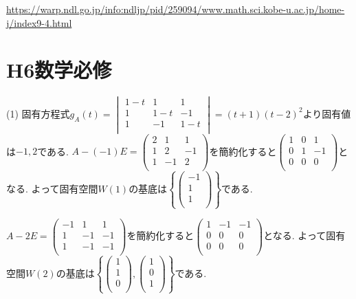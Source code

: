 \documentclass[
		book,
		head_space=20mm,
		foot_space=20mm,
		gutter=10mm,
		line_length=190mm
]{jlreq}
\begin{document}
\url{https://warp.ndl.go.jp/info:ndljp/pid/259094/www.math.sci.kobe-u.ac.jp/home-j/index9-4.html}

\section{H6数学必修}
(1) 固有方程式$g_A(t) = 
\begin{vmatrix}
1-t & 1 & 1 \\
1 & 1-t & -1 \\
1 & -1 & 1-t \\	
\end{vmatrix}=(t+1)(t-2)^2$より固有値は$-1,2$である.
$A-(-1)E= \begin{pmatrix}
2 & 1 & 1 \\
1 & 2 & -1 \\
1 & -1 & 2 \\
\end{pmatrix}$を簡約化すると$\begin{pmatrix}
1 & 0 & 1 \\
0 & 1 & -1 \\
0 & 0 & 0 \\
\end{pmatrix}$となる. よって固有空間$W(1)$の基底は$\left\{\begin{pmatrix}
-1 \\
1 \\
1 \\
\end{pmatrix}\right\}$である. 

$A-2E= \begin{pmatrix}
-1 & 1 & 1 \\
1 & -1 & -1 \\
1 & -1 & -1 \\
\end{pmatrix}$を簡約化すると$\begin{pmatrix}
1 & -1 & -1 \\
0 & 0 & 0 \\
0 & 0 & 0 \\
\end{pmatrix}$となる. よって固有空間$W(2)$の基底は$\left\{\begin{pmatrix}
1 \\
1 \\
0 \\
\end{pmatrix},\begin{pmatrix}
1 \\
0 \\
1 \\
\end{pmatrix}\right\}$である. 
\end{document}
